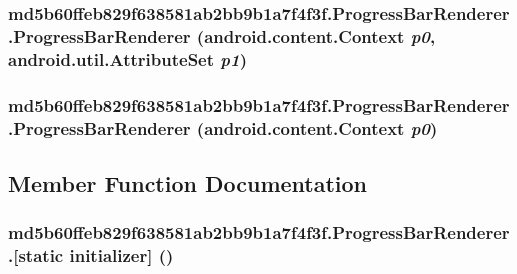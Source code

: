 \hypertarget{classmd5b60ffeb829f638581ab2bb9b1a7f4f3f_1_1_progress_bar_renderer_52dcb02f00d412da68b7ca790ffb2956}{
\subsubsection[{ProgressBarRenderer}]{\setlength{\rightskip}{0pt plus 5cm}md5b60ffeb829f638581ab2bb9b1a7f4f3f.ProgressBarRenderer.ProgressBarRenderer (android.content.Context {\em p0}, \/  android.util.AttributeSet {\em p1})}}
\label{classmd5b60ffeb829f638581ab2bb9b1a7f4f3f_1_1_progress_bar_renderer_52dcb02f00d412da68b7ca790ffb2956}


\hypertarget{classmd5b60ffeb829f638581ab2bb9b1a7f4f3f_1_1_progress_bar_renderer_376f162b961385dc3a452ce65fe97037}{
\subsubsection[{ProgressBarRenderer}]{\setlength{\rightskip}{0pt plus 5cm}md5b60ffeb829f638581ab2bb9b1a7f4f3f.ProgressBarRenderer.ProgressBarRenderer (android.content.Context {\em p0})}}
\label{classmd5b60ffeb829f638581ab2bb9b1a7f4f3f_1_1_progress_bar_renderer_376f162b961385dc3a452ce65fe97037}




\subsection{Member Function Documentation}
\hypertarget{classmd5b60ffeb829f638581ab2bb9b1a7f4f3f_1_1_progress_bar_renderer_a808e9330f77a266b3ee7a1255867f40}{
\subsubsection[{[static initializer]}]{\setlength{\rightskip}{0pt plus 5cm}md5b60ffeb829f638581ab2bb9b1a7f4f3f.ProgressBarRenderer.\mbox{[}static initializer\mbox{]} ()}}
\label{classmd5b60ffeb829f638581ab2bb9b1a7f4f3f_1_1_progress_bar_renderer_a808e9330f77a266b3ee7a1255867f40}




